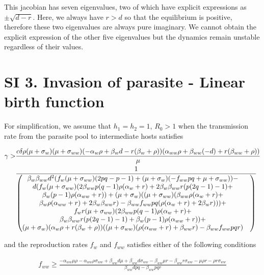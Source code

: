 \documentclass[11pt]{article}
\begin{document}
This jacobian has seven eigenvalues, two of which have explicit expressions as $\pm \sqrt{d - r}$. Here, we always have $r > d$ so that the equilibrium is positive, therefore these two eigenvalues are always pure imaginary. We cannot obtain the explicit expression of the other five eigenvalues but the dynamics remain unstable regardless of their values.

\section*{SI 3. Invasion of parasite - Linear birth function }


For simplification, we assume that $h_1 = h_2 = 1$, $R_0 > 1$ when the transmission rate from the parasite pool to intermediate hosts satisfies

\begin{align}
	\gamma > & \frac{c \delta  \rho  (\mu + \sigma_w) (\mu + \sigma_{ww}) (-\alpha_w \rho + \beta_w d-r (\beta_w+\rho )) (\alpha_{ww} \rho + \beta_{ww} (-d)+r (\beta_{ww}+\rho ))}{\mu } \notag \\
	& \frac{1}{\begin{pmatrix}
		\beta_w \beta_{ww} d^2 (f_w (\mu +\sigma_{ww}) (2 p q-p-1) + (\mu +\sigma_w) (-f_{ww} p q+\mu +\sigma_{ww})) - & \\
		 d (f_w (\mu +\sigma_{ww}) (2 \beta_{ww} p (q-1) \rho  (\alpha_w+r)+2 \beta_w \beta_{ww} r (p (2 q-1)-1)+ & \\
		 \beta_w (p-1) \rho  (\alpha_{ww}+r)) + (\mu +\sigma_w) ((\mu +\sigma_{ww}) (\beta_{ww} \rho  (\alpha_w+r) + & \\ 
		 \beta_w \rho  (\alpha_{ww}+r)+2 \beta_w \beta_{ww} r)-\beta_{ww} f_{ww} p q (\rho  (\alpha_w+r)+2 \beta_w r))) + & \\
		 f_w r (\mu +\sigma_{ww}) (2 \beta_{ww} p (q-1) \rho  (\alpha_w+r) +  & \\
		 \beta_w \beta_{ww} r (p (2 q-1)-1) + \beta_w (p-1) \rho  (\alpha_{ww}+r)) + & \\
		 (\mu +\sigma_w) (\alpha_w \rho +r (\beta_w+\rho )) ((\mu +\sigma_{ww}) (\rho  (\alpha_{ww}+r)+\beta_{ww} r)-\beta_{ww} f_{ww} p q r)
		\end{pmatrix}}
\end{align}

and the reproduction rates $f_w$ and $f_{ww}$ satisfies either of the following conditions

\begin{align}
f_{ww}\geq \frac{-\alpha_{ww} \mu  \rho -\alpha_{ww} \rho  \sigma_{ww} + \beta_{ww} d \mu +\beta_{ww} d \sigma_{ww}-\beta_{ww} \mu  r-\beta_{ww} r \sigma_{ww}-\mu  \rho  r-\rho  r \sigma_{ww}}{\beta_{ww} d p q-\beta_{ww} p q r}
\end{align}
\end{document}
